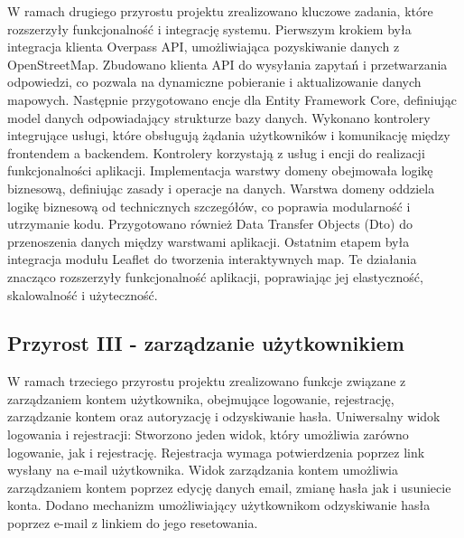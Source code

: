     W ramach drugiego przyrostu projektu zrealizowano kluczowe zadania, które rozszerzyły funkcjonalność i integrację systemu. \newline
    \indent Pierwszym krokiem była integracja klienta Overpass API, umożliwiająca pozyskiwanie danych z OpenStreetMap. Zbudowano klienta API do wysyłania zapytań i przetwarzania odpowiedzi, co pozwala na dynamiczne pobieranie i aktualizowanie danych mapowych.\newline
    \indent Następnie przygotowano encje dla Entity Framework Core, definiując model danych odpowiadający strukturze bazy danych.
    Wykonano kontrolery integrujące usługi, które obsługują żądania użytkowników i komunikację między frontendem a backendem. Kontrolery korzystają z usług i encji do realizacji funkcjonalności aplikacji.\newline
    \indent Implementacja warstwy domeny obejmowała logikę biznesową, definiując zasady i operacje na danych. Warstwa domeny oddziela logikę biznesową od technicznych szczegółów, co poprawia modularność i utrzymanie kodu.\newline
    \indent Przygotowano również Data Transfer Objects (Dto) do przenoszenia danych między warstwami aplikacji.    \newline
    \indent Ostatnim etapem była integracja modułu Leaflet do tworzenia interaktywnych map.\newline
    Te działania znacząco rozszerzyły funkcjonalność aplikacji, poprawiając jej elastyczność, skalowalność i użyteczność.\newline


    \subsection{Przyrost III - zarządzanie użytkownikiem}
    \label{sec:przyrost3}
    W ramach trzeciego przyrostu projektu zrealizowano funkcje związane z zarządzaniem kontem użytkownika, obejmujące logowanie, rejestrację, zarządzanie kontem oraz autoryzację i odzyskiwanie hasła. \newline
    \indent Uniwersalny widok logowania i rejestracji: Stworzono jeden widok, który umożliwia zarówno logowanie, jak i rejestrację. Rejestracja wymaga potwierdzenia poprzez link wysłany na e-mail użytkownika. \newline
    \indent Widok zarządzania kontem umożliwia zarządzaniem kontem poprzez edycję danych email, zmianę hasła jak i usuniecie konta. \newline 
    \indent Dodano mechanizm umożliwiający użytkownikom odzyskiwanie hasła poprzez e-mail z linkiem do jego resetowania.

